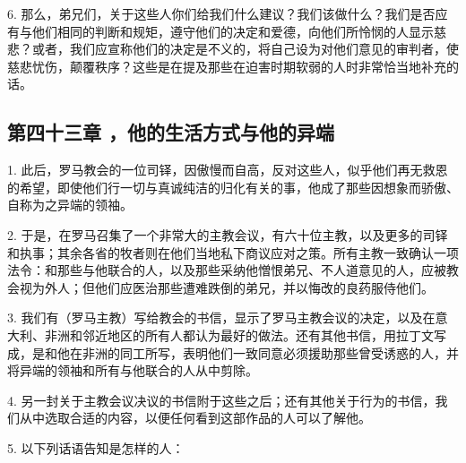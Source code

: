 6. 那么，弟兄们，关于这些人你们给我们什么建议？我们该做什么？我们是否应有与他们相同的判断和规矩，遵守他们的决定和爱德，向他们所怜悯的人显示慈悲？或者，我们应宣称他们的决定是不义的，将自己设为对他们意见的审判者，使慈悲忧伤，颠覆秩序？这些是在提及那些在迫害时期软弱的人时非常恰当地补充的话。\par


\subsection{第四十三章 ，他的生活方式与他的异端}

1. 此后，罗马教会的一位司铎，因傲慢而自高，反对这些人，似乎他们再无救恩的希望，即使他们行一切与真诚纯洁的归化有关的事，他成了那些因想象而骄傲、自称为之异端的领袖。\par

2. 于是，在罗马召集了一个非常大的主教会议，有六十位主教，以及更多的司铎和执事；其余各省的牧者则在他们当地私下商议应对之策。所有主教一致确认一项法令：和那些与他联合的人，以及那些采纳他憎恨弟兄、不人道意见的人，应被教会视为外人；但他们应医治那些遭难跌倒的弟兄，并以悔改的良药服侍他们。\par

3. 我们有（罗马主教）写给教会的书信，显示了罗马主教会议的决定，以及在意大利、非洲和邻近地区的所有人都认为最好的做法。还有其他书信，用拉丁文写成，是和他在非洲的同工所写，表明他们一致同意必须援助那些曾受诱惑的人，并将异端的领袖和所有与他联合的人从中剪除。\par

4. 另一封关于主教会议决议的书信附于这些之后；还有其他关于行为的书信，我们从中选取合适的内容，以便任何看到这部作品的人可以了解他。\par

5. 以下列话语告知是怎样的人：\par

\par

\par

